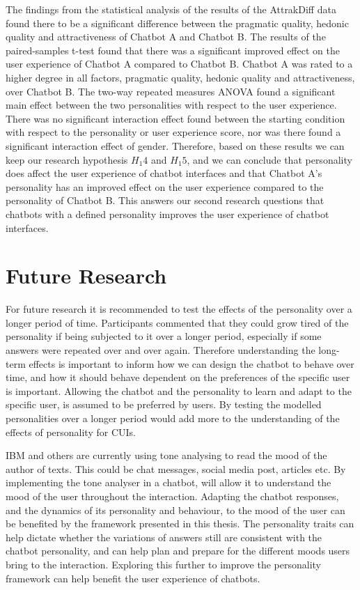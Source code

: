 The findings from the statistical analysis of the results of the AttrakDiff data found there to be a significant difference between the pragmatic quality, hedonic quality and attractiveness of Chatbot A and Chatbot B. The results of the paired-samples t-test found that there was a significant improved effect on the user experience of Chatbot A compared to Chatbot B. Chatbot A was rated to a higher degree in all factors, pragmatic quality, hedonic quality and attractiveness, over Chatbot B. The two-way repeated measures ANOVA found a significant main effect between the two personalities with respect to the user experience. There was no significant interaction effect found between the starting condition with respect to the personality or user experience score, nor was there found a significant interaction effect of gender. Therefore, based on these results we can keep our research hypothesis $H_1 4$ and $H_1 5$, and we can conclude that personality does affect the user experience of chatbot interfaces and that Chatbot A's personality has an improved effect on the user experience compared to the personality of Chatbot B. This answers our second research questions that chatbots with a defined personality improves the user experience of chatbot interfaces.

\vspace{5mm}

\section{Future Research}
\label{sec:future}

For future research it is recommended to test the effects of the personality over a longer period of time. Participants commented that they could grow tired of the personality if being subjected to it over a longer period, especially if some answers were repeated over and over again. Therefore understanding the long-term effects is important to inform how we can design the chatbot to behave over time, and how it should behave dependent on the preferences of the specific user is important. Allowing the chatbot and the personality to learn and adapt to the specific user, is assumed to be preferred by users. By testing the modelled personalities over a longer period would add more to the understanding of the effects of personality for CUIs.

IBM and others are currently using tone analysing to read the mood of the author of texts. This could be chat messages, social media post, articles etc. By implementing the tone analyser in a chatbot, will allow it to understand the mood of the user throughout the interaction. Adapting the chatbot responses, and the dynamics of its personality and behaviour, to the mood of the user can be benefited by the framework presented in this thesis. The personality traits can help dictate whether the variations of answers still are consistent with the chatbot personality, and can help plan and prepare for the different moods users bring to the interaction. Exploring this further to improve the personality framework can help benefit the user experience of chatbots.

